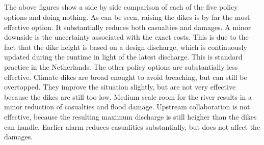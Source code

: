 \documentclass{article}
\begin{document}
    \begin{center}
    \end{center}
    { \hspace*{\fill} \\}
    
    \begin{center}
    \end{center}
    { \hspace*{\fill} \\}
    
    \begin{center}
    \end{center}
    { \hspace*{\fill} \\}
    
    \begin{center}
    \end{center}
    { \hspace*{\fill} \\}
    
    The above figures show a side by side comparison of each of the five
policy options and doing nothing. As can be seen, raising the dikes is
by far the most effective option. It substantially reduces both
casualties and damages. A minor downside is the uncertainty associated
with the exact costs. This is due to the fact that the dike height is
based on a design discharge, which is continuously updated during the
runtime in light of the latest discharge. This is standard practice in
the Netherlands. The other policy options are substantially less
effective. Climate dikes are broad enought to avoid breaching, but can
still be overtopped. They improve the situation slightly, but are not
very effective because the dikes are still too low. Medium scale room
for the river results in a minor reduction of casualties and flood
damage. Upstream collaboration is not effective, because the resulting
maximum discharge is still heigher than the dikes can handle. Earlier
alarm reduces casualities substantially, but does not affect the
damages.
\end{document}
